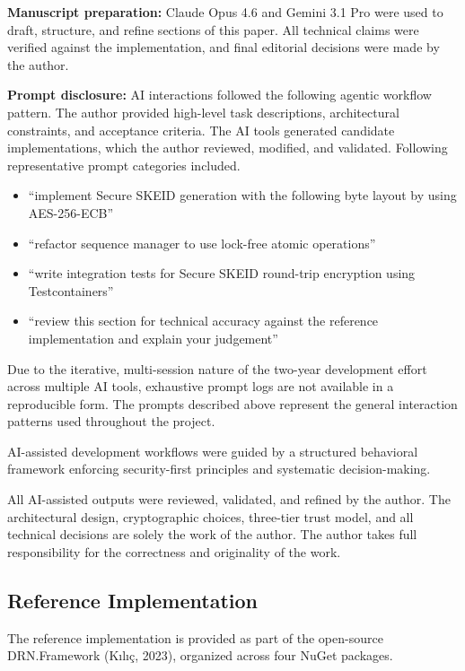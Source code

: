 \documentclass[fleqn,10pt]{wlpeerj}
\providecommand{\tightlist}{%
  \setlength{\itemsep}{0pt}\setlength{\parskip}{0pt}}
\begin{document}
\textbf{Manuscript preparation:} Claude Opus 4.6 and Gemini 3.1 Pro were
used to draft, structure, and refine sections of this paper. All
technical claims were verified against the implementation, and final
editorial decisions were made by the author.

\textbf{Prompt disclosure:} AI interactions followed the following
agentic workflow pattern. The author provided high-level task
descriptions, architectural constraints, and acceptance criteria. The AI
tools generated candidate implementations, which the author reviewed,
modified, and validated. Following representative prompt categories
included.

\begin{itemize}
\tightlist
\item
  ``implement Secure SKEID generation with the following byte layout by
  using AES-256-ECB''
\item
  ``refactor sequence manager to use lock-free atomic operations''
\item
  ``write integration tests for Secure SKEID round-trip encryption using
  Testcontainers''
\item
  ``review this section for technical accuracy against the reference
  implementation and explain your judgement''
\end{itemize}

Due to the iterative, multi-session nature of the two-year development
effort across multiple AI tools, exhaustive prompt logs are not
available in a reproducible form. The prompts described above represent
the general interaction patterns used throughout the project.

AI-assisted development workflows were guided by a structured behavioral
framework enforcing security-first principles and systematic
decision-making.

All AI-assisted outputs were reviewed, validated, and refined by the
author. The architectural design, cryptographic choices, three-tier
trust model, and all technical decisions are solely the work of the
author. The author takes full responsibility for the correctness and
originality of the work.

\newpage

\subsection{Reference Implementation}\label{reference-implementation}

The reference implementation is provided as part of the open-source
DRN.Framework (Kılıç, 2023), organized across four NuGet packages.
\end{document}
